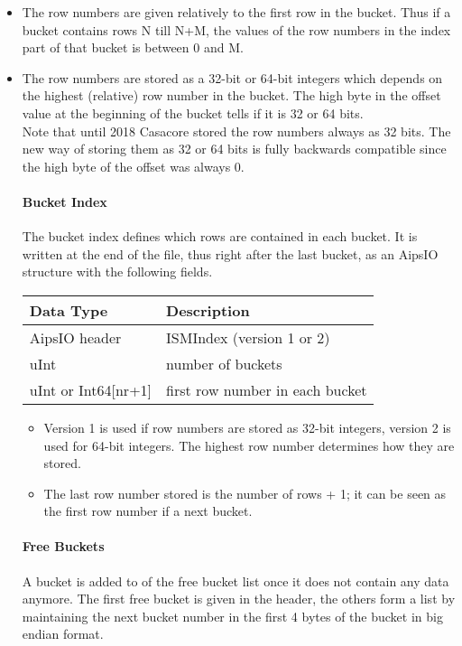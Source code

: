 \begin{itemize}
\item
The row numbers are given relatively to the first row in the bucket.
Thus if a bucket contains rows N till N+M, the values of the row numbers
in the index part of that bucket is between 0 and M.
\item
The row numbers are stored as a 32-bit or 64-bit integers which depends
on the highest (relative) row number in the bucket. The high byte in
the offset value at the beginning of the bucket tells if it is 32 or 64 bits.
\\Note that until 2018 Casacore stored the row numbers always as 32 bits.
The new way of storing them as 32 or 64 bits is fully backwards
compatible since the high byte of the offset was always 0.
\begin{itemize}

\paragraph{Bucket Index\\}
The bucket index defines which rows are contained in each bucket.
It is written at the end of the file, thus right after the last bucket, as
an AipsIO structure with the following fields.

\vspace{0.15in}
\begin{tabular}{|l|p{13cm}|} \hline
  Data Type & Description \\ \hline\hline
  AipsIO header & ISMIndex (version 1 or 2) \\
  uInt & number of buckets \\
  uInt or Int64[nr+1] & first row number in each bucket \\
  \hline
\end{tabular}
\vspace{0.15in}

\begin{itemize}
\item Version 1 is used if row numbers are stored as 32-bit integers,
  version 2 is used for 64-bit integers. The highest row number
  determines how they are stored.
\item The last row number stored is the number of rows + 1; it can be
  seen as the first row number if a next bucket.
\end{itemize}

\paragraph{Free Buckets\\}
A bucket is added to of the free bucket list once it does not contain any
  data anymore.
The first free bucket is given in the header, the others form a list
  by maintaining the next bucket number in the first 4 bytes of the
  bucket in big endian format.


\end{itemize}
\end{itemize}
